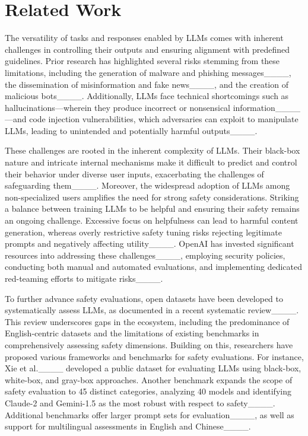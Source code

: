 \section{Related Work}
\label{Related Work}

The versatility of tasks and responses enabled by LLMs comes with inherent challenges in controlling their outputs and ensuring alignment with predefined guidelines. Prior research has highlighted several risks stemming from these limitations, including the generation of malware and phishing messages____, the dissemination of misinformation and fake news____, and the creation of malicious bots____. Additionally, LLMs face technical shortcomings such as hallucinations—wherein they produce incorrect or nonsensical information____—and code injection vulnerabilities, which adversaries can exploit to manipulate LLMs, leading to unintended and potentially harmful outputs____.

These challenges are rooted in the inherent complexity of LLMs. Their black-box nature and intricate internal mechanisms make it difficult to predict and control their behavior under diverse user inputs, exacerbating the challenges of safeguarding them____. Moreover, the widespread adoption of LLMs among non-specialized users amplifies the need for strong safety considerations. Striking a balance between training LLMs to be helpful and ensuring their safety remains an ongoing challenge. Excessive focus on helpfulness can lead to harmful content generation, whereas overly restrictive safety tuning risks rejecting legitimate prompts and negatively affecting utility____. OpenAI has invested significant resources into addressing these challenges____, employing security policies, conducting both manual and automated evaluations, and implementing dedicated red-teaming efforts to mitigate risks____.

To further advance safety evaluations, open datasets have been developed to systematically assess LLMs, as documented in a recent systematic review____. This review underscores gaps in the ecosystem, including the predominance of English-centric datasets and the limitations of existing benchmarks in comprehensively assessing safety dimensions. Building on this, researchers have proposed various frameworks and benchmarks for safety evaluations. For instance, Xie et al.____ developed a public dataset for evaluating LLMs using black-box, white-box, and gray-box approaches. Another benchmark expands the scope of safety evaluation to 45 distinct categories, analyzing 40 models and identifying Claude-2 and Gemini-1.5 as the most robust with respect to safety____. Additional benchmarks offer larger prompt sets for evaluation____, as well as support for multilingual assessments in English and Chinese____.

